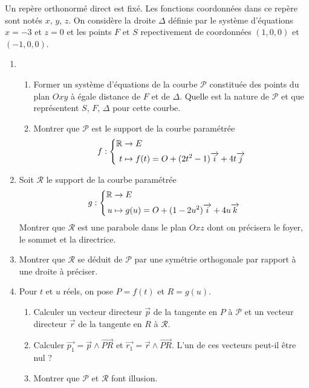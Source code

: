 Un repère orthonormé direct est fixé. Les fonctions coordonnées dans ce repère sont notés $x$, $y$, $z$. On considère la droite $\Delta$ définie par le système d'équations $x=-3$ et $z=0$ et les points $F$ et $S$ repectivement de coordonnées $(1,0,0)$ et $(-1,0,0)$.
\begin{enumerate}
 \item 
\begin{enumerate}
 \item  Former un système d'équations de la courbe $\mathcal P$ constituée des points du plan $Oxy$ à égale distance de $F$ et de $\Delta$. Quelle est la nature de $\mathcal{P}$ et que représentent $S$, $F$, $\Delta$ pour cette courbe.
 \item Montrer que $\mathcal{P}$ est le support de la courbe paramétrée
\begin{displaymath}
 f:
\left\lbrace 
\begin{aligned}
 \mathbb{R} &\rightarrow E \\ t &\mapsto f(t)= O+(2t^2-1)\overrightarrow i +4t \overrightarrow j
\end{aligned}
\right. 
\end{displaymath}
\end{enumerate}

\item Soit $\mathcal{R}$ le support de la courbe paramétrée
\begin{displaymath}
 g:
\left\lbrace 
\begin{aligned}
 \mathbb{R} &\rightarrow E \\ u &\mapsto g(u)= O+(1-2u^2)\overrightarrow i +4u \overrightarrow k
\end{aligned}
\right. 
\end{displaymath}
Montrer que $\mathcal{R}$ est une parabole dans le plan $Oxz$ dont on précisera le foyer, le sommet et la directrice.

\item Montrer que $\mathcal{R}$ se déduit de $\mathcal{P}$ par une symétrie orthogonale par rapport à une droite à préciser.

\item Pour $t$ et $u$ réels, on pose $P=f(t)$ et $R=g(u)$.
\begin{enumerate}
 \item Calculer un vecteur directeur $\overrightarrow p$ de la tangente en $P$ à $\mathcal{P}$ et un vecteur directeur $\overrightarrow r$ de la tangente en $R$ à $\mathcal{R}$.
 \item Calculer $\overrightarrow{p_1} = \overrightarrow{p}\wedge \overrightarrow{PR}$ et $ \overrightarrow{r_1} = \overrightarrow{r}\wedge \overrightarrow{PR}$. L'un de ces vecteurs peut-il être nul ?
 \item Montrer que $\mathcal{P}$ et $\mathcal{R}$ font illusion.
\end{enumerate}


\end{enumerate}
